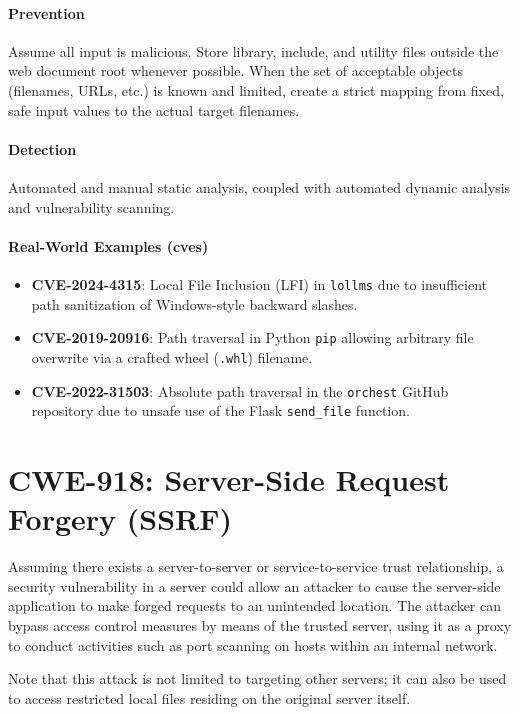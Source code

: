 \paragraph{Prevention} Assume all input is malicious. Store library, include, and utility files outside the web document root whenever possible. When the set of acceptable objects (filenames, URLs, etc.) is known and limited, create a strict mapping from fixed, safe input values to the actual target filenames.

\paragraph{Detection} Automated and manual static analysis, coupled with automated dynamic analysis and vulnerability scanning.

\paragraph{Real-World Examples (\glspl{cve})}
\begin{itemize}
    \item \textbf{CVE-2024-4315}: Local File Inclusion (LFI) in \texttt{lollms} due to insufficient path sanitization of Windows-style backward slashes.
    \item \textbf{CVE-2019-20916}: Path traversal in Python \texttt{pip} allowing arbitrary file overwrite via a crafted wheel (\texttt{.whl}) filename.
    \item \textbf{CVE-2022-31503}: Absolute path traversal in the \texttt{orchest} GitHub repository due to unsafe use of the Flask \texttt{send\_file} function.
\end{itemize}

\section{CWE-918: Server-Side Request Forgery (SSRF)}
Assuming there exists a server-to-server or service-to-service trust relationship, a security vulnerability in a server could allow an attacker to cause the server-side application to make forged requests to an unintended location. The attacker can bypass access control measures by means of the trusted server, using it as a proxy to conduct activities such as port scanning on hosts within an internal network.

\noindent Note that this attack is not limited to targeting other servers; it can also be used to access restricted local files residing on the original server itself.

